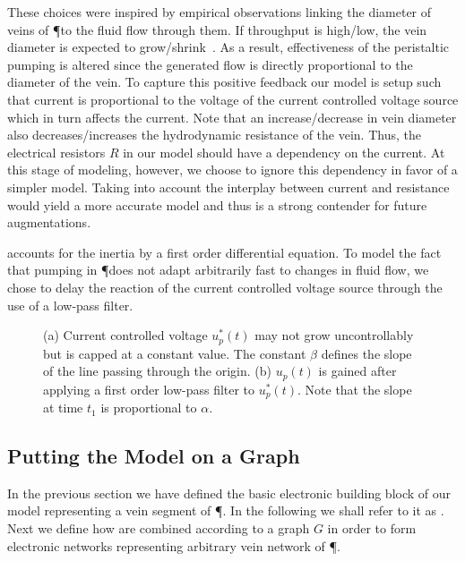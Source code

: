 These choices were inspired by empirical observations linking the diameter of veins of \P to the fluid flow through them. If throughput is high/low, the vein diameter is expected to grow/shrink~\cite{nakagaki2000intelligence}. As a result, effectiveness of the peristaltic pumping is altered since the generated flow is directly proportional to the diameter of the vein. To capture this positive feedback our model is setup such that current is proportional to the voltage of the current controlled voltage source which in turn affects the current. Note that an increase/decrease in vein diameter also decreases/increases the hydrodynamic resistance of the vein. Thus, the electrical resistors $R$ in our model should have a dependency on the current. At this stage of modeling, however, we choose to ignore this dependency in favor of a simpler model. Taking into account the interplay between current and resistance would yield a more accurate model and thus is a strong contender for future augmentations.

 accounts for the inertia by a first order differential equation. To model the fact that pumping in \P does not adapt arbitrarily fast to changes in fluid flow, we chose to delay the reaction of the current controlled voltage source through the use of a low-pass filter.
  
\begin{figure}
    \centering
        \subfloat[]{%
    \label{fig:steady}%
    }%
    \qquad
      \subfloat[]{%
    \label{fig:transient}%
    }%
      \caption[Details for current controlled voltage sources.]{(a) Current controlled voltage $u^*_p(t)$ may not grow uncontrollably but is capped at a constant value. The constant $\beta$ defines the slope of the line passing through the origin. (b) $u_p(t)$ is gained after applying a first order low-pass filter to $u^*_p(t)$. Note that the slope
      at time $t_1$ is proportional to $\alpha$.}
\end{figure}


\subsection{Putting the Model on a Graph}

  In the previous section we have defined the basic electronic building block of our model representing a vein segment of \P. In the following we shall refer to it as \Pe. Next we define how \Pes are combined according to a graph $G$ in order to form electronic networks representing arbitrary vein network of \P.


